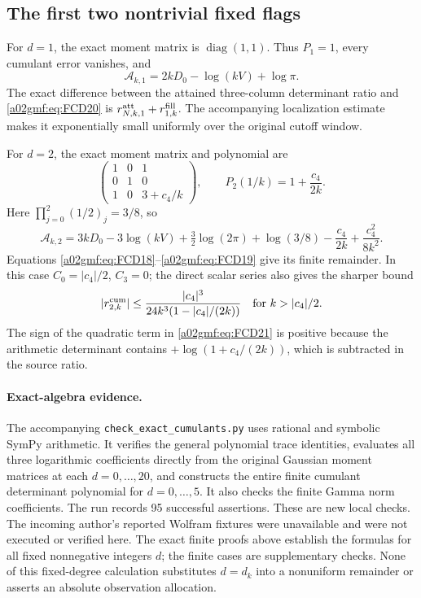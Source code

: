 \subsection{The first two nontrivial fixed flags}

For \(d=1\), the exact moment matrix is \(\operatorname{diag}(1,1)\).
Thus \(P_1=1\), every cumulant error vanishes, and
\begin{equation}
 \mathcal A_{k,1}=2kD_0-\log(kV)+\log\pi .
 \tag{FCD20}\label{a02gmf:eq:FCD20}
\end{equation}
The exact difference between the attained three-column determinant
ratio and \eqref{a02gmf:eq:FCD20} is
\(r_{N,k,1}^{\rm att}+r_{1,k}^{\rm fill}\).
The accompanying localization estimate makes it exponentially small
uniformly over the original cutoff window.

For \(d=2\), the exact moment matrix and polynomial are
\[
 \begin{pmatrix}
 1&0&1\\
 0&1&0\\
 1&0&3+c_4/k
 \end{pmatrix},
 \qquad P_2(1/k)=1+\frac{c_4}{2k}.
\]
Here \(\prod_{j=0}^2(1/2)_j=3/8\), so
\begin{equation}
 \mathcal A_{k,2}
 =3kD_0-3\log(kV)+\tfrac32\log(2\pi)+\log(3/8)
                 -\frac{c_4}{2k}+\frac{c_4^2}{8k^2}.
 \tag{FCD21}\label{a02gmf:eq:FCD21}
\end{equation}
Equations \eqref{a02gmf:eq:FCD18}--\eqref{a02gmf:eq:FCD19} give its finite remainder.
In this case \(C_0=|c_4|/2\), \(C_3=0\); the direct scalar series also
gives the sharper bound
\[
 |r_{2,k}^{\rm cum}|
    \le\frac{|c_4|^3}{24k^3(1-|c_4|/(2k))}
       \quad\text{for }k>|c_4|/2 .
\]
The sign of the quadratic term in \eqref{a02gmf:eq:FCD21} is positive because
the arithmetic determinant contains \(+\log(1+c_4/(2k))\), which is
subtracted in the source ratio.

\paragraph{Exact-algebra evidence.}
The accompanying \texttt{check\_exact\_cumulants.py} uses rational and
symbolic SymPy arithmetic. It verifies the general polynomial trace
identities, evaluates all three logarithmic coefficients directly from
the original Gaussian moment matrices at each \(d=0,\ldots,20\), and
constructs the entire finite cumulant determinant polynomial for
\(d=0,\ldots,5\). It also checks the finite Gamma norm coefficients.
The run records 95 successful assertions. These are new local checks.
The incoming author's reported Wolfram fixtures were unavailable and
were not executed or verified here. The exact finite proofs above
establish the formulas for all fixed nonnegative integers \(d\);
the finite cases are supplementary checks. None of this fixed-degree
calculation substitutes \(d=d_k\) into a nonuniform remainder or
asserts an absolute observation allocation.

